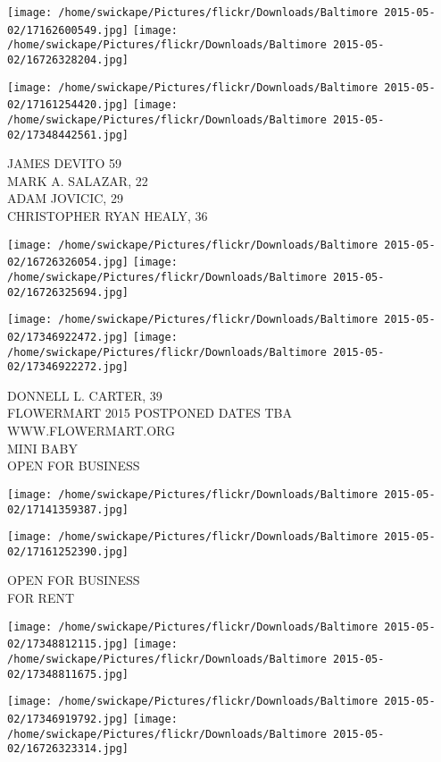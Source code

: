 \documentclass[10pt,letterpaper]{article}
\begin{document}
\texttt{[image: /home/swickape/Pictures/flickr/Downloads/Baltimore 2015-05-02/17162600549.jpg]}
\texttt{[image: /home/swickape/Pictures/flickr/Downloads/Baltimore 2015-05-02/16726328204.jpg]}

\texttt{[image: /home/swickape/Pictures/flickr/Downloads/Baltimore 2015-05-02/17161254420.jpg]}
\texttt{[image: /home/swickape/Pictures/flickr/Downloads/Baltimore 2015-05-02/17348442561.jpg]}

JAMES DEVITO 59\\
MARK A. SALAZAR, 22\\
ADAM JOVICIC, 29\\
CHRISTOPHER RYAN HEALY, 36\\
\pagebreak

\texttt{[image: /home/swickape/Pictures/flickr/Downloads/Baltimore 2015-05-02/16726326054.jpg]}
\texttt{[image: /home/swickape/Pictures/flickr/Downloads/Baltimore 2015-05-02/16726325694.jpg]}

\texttt{[image: /home/swickape/Pictures/flickr/Downloads/Baltimore 2015-05-02/17346922472.jpg]}
\texttt{[image: /home/swickape/Pictures/flickr/Downloads/Baltimore 2015-05-02/17346922272.jpg]}

DONNELL L. CARTER, 39\\
FLOWERMART 2015 POSTPONED DATES TBA WWW.FLOWERMART.ORG\\
MINI BABY\\
OPEN FOR BUSINESS\\
\pagebreak

\texttt{[image: /home/swickape/Pictures/flickr/Downloads/Baltimore 2015-05-02/17141359387.jpg]}

\vspace{0.25in}
\texttt{[image: /home/swickape/Pictures/flickr/Downloads/Baltimore 2015-05-02/17161252390.jpg]}

OPEN FOR BUSINESS\\
FOR RENT\\
\pagebreak

\texttt{[image: /home/swickape/Pictures/flickr/Downloads/Baltimore 2015-05-02/17348812115.jpg]}
\texttt{[image: /home/swickape/Pictures/flickr/Downloads/Baltimore 2015-05-02/17348811675.jpg]}

\texttt{[image: /home/swickape/Pictures/flickr/Downloads/Baltimore 2015-05-02/17346919792.jpg]}
\texttt{[image: /home/swickape/Pictures/flickr/Downloads/Baltimore 2015-05-02/16726323314.jpg]}
\end{document}
